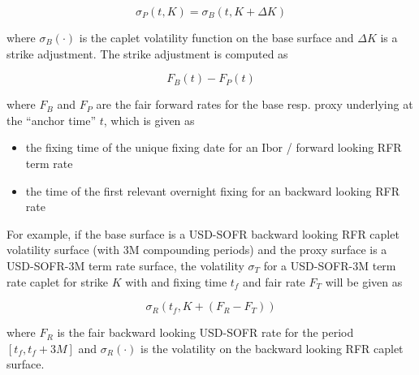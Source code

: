 $$
\sigma_P(t, K) = \sigma_B(t, K + \Delta K)
$$

where $\sigma_B(\cdot)$ is the caplet volatility function on the base surface and $\Delta K$ is a strike adjustment. The
strike adjustment is computed as

\begin{equation}
F_B(t) - F_P(t)
\end{equation}

where $F_B$ and $F_P$ are the fair forward rates for the base resp. proxy underlying at the ``anchor time'' $t$, which
is given as

\begin{itemize}
\item the fixing time of the unique fixing date for an Ibor / forward looking RFR term rate
\item the time of the first relevant overnight fixing for an backward looking RFR rate
\end{itemize}

For example, if the base surface is a USD-SOFR backward looking RFR caplet volatility surface (with 3M compounding
periods) and the proxy surface is a USD-SOFR-3M term rate surface, the volatility $\sigma_T$ for a USD-SOFR-3M term rate
caplet for strike $K$ with and fixing time $t_f$ and fair rate $F_T$ will be given as

\begin{equation}
\sigma_R(t_f, K + (F_R - F_T))
\end{equation}

where $F_R$ is the fair backward looking USD-SOFR rate for the period $[t_f, t_f + 3M]$ and $\sigma_R(\cdot)$ is the
volatility on the backward looking RFR caplet surface.
